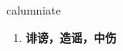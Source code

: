 
\begin{frame}
{\huge calumniate}
\begin{center}
\begin{enumerate}\Large
  \item \textbf{诽谤，造谣，中伤}
\end{enumerate}
\end{center}
\end{frame}
